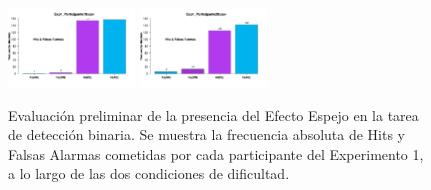\documentclass[a4paper ]{article}
\begin{document}
\begin{figure}[th]
\includegraphics[width=0.3\textwidth]{Figures/MirrorRate_Exp1_P19} \includegraphics[width=0.3\textwidth]{Figures/MirrorRate_Exp1_P20} 
\caption[Hits y Falsas Alarmas entre condiciones; Experimento 1]{Evaluación preliminar de la presencia del Efecto Espejo en la tarea de detección binaria. Se muestra la frecuencia absoluta de Hits y Falsas Alarmas cometidas por cada participante del Experimento 1, a lo largo de las dos condiciones de dificultad.}
\label{fig:MRate_E1}
\end{figure}
\end{document}
